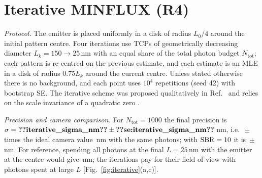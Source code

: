 \section{Iterative MINFLUX (R4)}\label{sec:iterative}

\emph{Protocol.} The emitter is placed uniformly in a disk of radius $L_0/4$ around the initial
pattern centre. Four iterations use TCPs of geometrically decreasing diameter
$L_k=150\to25$\,nm with an equal share of the total photon budget $N_{\mathrm{tot}}$; each
pattern is re-centred on the previous estimate, and each estimate is an MLE in a disk of radius
$0.75L_k$ around the current centre. Unless stated otherwise there is no background, and each
point uses $10^4$ repetitions (seed 42) with bootstrap SE. The iterative scheme was proposed
qualitatively in Ref.~\cite{Balzarotti2017} and relies on the scale invariance of a quadratic
zero \cite{Stefani2023}.

\emph{Precision and camera comparison.} For $N_{\mathrm{tot}}=1000$ the final precision is
$\sigma=\pnum{iterative_sigma_nm}\pm\pnumse{iterative_sigma_nm}$\,nm,
i.e.\ \,$\pm$\,
times the ideal camera value \,nm with the same
photons; with $\mathrm{SBR}=10$ it is
\,$\pm$\,\,nm.
For reference, spending all photons at the final $L=25$\,nm with the emitter at the centre
would give \,nm;
the iterations pay for their field of view with photons spent at large $L$
[Fig.~\ref{fig:iterative}(a,c)].


